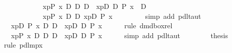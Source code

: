 \begin{isabellebody}
\ \ \ \ \ \ \ \ \ \ {\isacharparenleft}\ {\isacharbrackleft}{\isacharhash}\ x{\isasymleftarrow}p{\isacharbrackright}{\isacharparenleft}P\ x{\isacharparenright}\ {\isasymlongleftrightarrow}\isactrlsub D\ {\isasymnot}\isactrlsub D\ {\isasymnot}\isactrlsub D\ {\isacharbrackleft}{\isacharhash}\ x{\isasymleftarrow}p{\isacharbrackright}{\isacharparenleft}{\isasymnot}\isactrlsub D\ {\isasymnot}\isactrlsub D\ P\ x{\isacharparenright}\ {\isacharparenright}\ {\isasymlongrightarrow}\isactrlsub D\ \isanewline
\ \ \ \ \ \ \ \ \ \ {\isacharparenleft}\ {\isacharbrackleft}{\isacharhash}\ x{\isasymleftarrow}p{\isacharbrackright}{\isacharparenleft}P\ x{\isacharparenright}\ {\isasymlongleftrightarrow}\isactrlsub D\ {\isasymnot}\isactrlsub D\ {\isasymlangle}x{\isasymleftarrow}p{\isasymrangle}{\isacharparenleft}{\isasymnot}\isactrlsub D\ P\ x{\isacharparenright}\ {\isacharparenright}\ {\isachardoublequote}\ \isanewline
\ \ \ \ \isamarkupfalse%
\ {\isacharparenleft}simp\ add{\isacharcolon}\ pdl{\isacharunderscore}taut{\isacharparenright}\isanewline
\ \ \isamarkupfalse%
\ \isanewline
\ \ \isamarkupfalse%
\ {\isachardoublequote}{\isasymturnstile}\ \ {\isasymlangle}x{\isasymleftarrow}p{\isasymrangle}{\isacharparenleft}{\isasymnot}\isactrlsub D\ P\ x{\isacharparenright}\ {\isasymlongleftrightarrow}\isactrlsub D\ {\isasymnot}\isactrlsub D\ {\isacharbrackleft}{\isacharhash}\ x{\isasymleftarrow}p{\isacharbrackright}{\isacharparenleft}{\isasymnot}\isactrlsub D\ {\isasymnot}\isactrlsub D\ P\ x{\isacharparenright}{\isachardoublequote}\isanewline
\ \ \ \ \isamarkupfalse%
\ {\isacharparenleft}rule\ dmd{\isacharunderscore}box{\isacharunderscore}rel{\isacharparenright}\isanewline
\ \ \isamarkupfalse%
\isanewline
\ \ \isamarkupfalse%
\ {\isachardoublequote}{\isasymturnstile}\ {\isacharbrackleft}{\isacharhash}\ x{\isasymleftarrow}p{\isacharbrackright}{\isacharparenleft}P\ x{\isacharparenright}\ {\isasymlongleftrightarrow}\isactrlsub D\ {\isasymnot}\isactrlsub D\ {\isasymnot}\isactrlsub D\ {\isacharbrackleft}{\isacharhash}\ x{\isasymleftarrow}p{\isacharbrackright}{\isacharparenleft}{\isasymnot}\isactrlsub D\ {\isasymnot}\isactrlsub D\ P\ x{\isacharparenright}{\isachardoublequote}\isanewline
\ \ \ \ \isamarkupfalse%
\ {\isacharparenleft}simp\ add{\isacharcolon}\ pdl{\isacharunderscore}taut{\isacharparenright}\isanewline
\ \ \isamarkupfalse%
\ \isanewline
\ \ \isamarkupfalse%
\ {\isacharquery}thesis\isanewline
\ \ \ \ \isamarkupfalse%
\ {\isacharparenleft}rule\ pdl{\isacharunderscore}mp{\isacharunderscore}{}x{\isacharparenright}\isanewline

\end{isabellebody}
